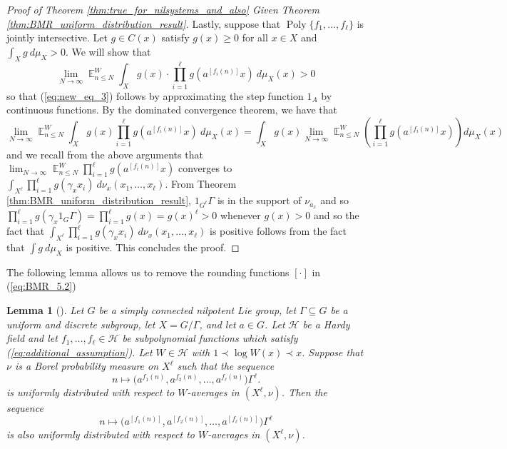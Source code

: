 \documentclass[12pt]{article}
\theoremstyle{plain} %
\newtheorem{lemma}[theorem]{Lemma}
\theoremstyle{definition} %
\theoremstyle{plain}
\theoremstyle{plain}
\numberwithin{equation}{section}
\renewcommand{\leq}{\leqslant}
\renewcommand{\geq}{\geqslant}
\renewcommand{\subset}{\subseteq}
\newcommand{\1}{\mathbbm{1}}
\newcommand{\E}{\operatorname{\mathbb{E}}}
\newcommand{\Poly}{\operatorname{Poly}}
\newcommand{\oo}{\infty}
\newcommand{\round}[1]{[ #1 ]}
\begin{document}
\begin{proof}[Proof of Theorem \ref{thm:true_for_nilsystems_and_also} Given Theorem \ref{thm:BMR_uniform_distribution_result}]
Lastly, suppose that $\Poly\{f_1,\dots, f_{\ell}\}$ is jointly intersective. Let $g\in C(x)$ satisfy $g(x)\geq 0$ for all $x\in X$ and $\int_X g~d\mu_X>0$. We will show that 
\begin{equation}\label{eq:u.d._reduction_goal}
    \lim_{N\to\oo}\E_{n\leq N}^W\int_X g(x)\cdot \prod_{i=1}^{\ell}g(a^{\round{f_i(n)}}x)~d\mu_X(x) >0
\end{equation}
so that (\ref{eq:new_eq_3}) follows by approximating the step function $1_A$ by continuous functions. By the dominated convergence theorem, we have that
\[
\lim_{N\to\oo}\E_{n\leq N}^W\int_X g(x) \prod_{i=1}^{\ell}g(a^{\round{f_i(n)}}x)~d\mu_X(x)=\int_X g(x) \lim_{N\to\oo}\E_{n\leq N}^W\left(\prod_{i=1}^{\ell}g(a^{\round{f_i(n)}}x)\right)d\mu_X(x) 
\]
and we recall from the above arguments that $\lim_{N\to\oo}\E_{n\leq N}^W\prod_{i=1}^{\ell}g(a^{\round{f_i(n)}}x)$ converges to $\int_{X^{\ell}}\prod_{i=1}^{\ell}g(\gamma_x x_i)~d\nu_{x}(x_1,\dots, x_{\ell})$. From Theorem \ref{thm:BMR_uniform_distribution_result}, $1_{G^{\ell}}\Gamma$ is in the support of $\nu_{a_x}$ and so $\prod_{i=1}^{\ell}g(\gamma_x 1_{G}\Gamma) = \prod_{i=1}^{\ell}g(x) =g(x)^{\ell}>0$ whenever $g(x)>0$ and so the fact that $\int_{X^{\ell}}\prod_{i=1}^{\ell}g(\gamma_x x_i)~d\nu_{x}(x_1,\dots, x_{\ell})$ is positive follows from the fact that $\int g ~d\mu_X$ is positive. This concludes the proof. 
\end{proof}


The following lemma allows us to remove the rounding functions $\round{\cdot}$ in (\ref{eq:BMR_5.2})  

\begin{lemma}[{\cite[Section 5.4]{BMR24}}]\label{lem:floor_removal}
Let $G$ be a simply connected nilpotent Lie group, let
$\Gamma \subset G$ be a uniform and discrete subgroup, let
$X = G/\Gamma$, and let $a \in G$. Let $\mathcal{H}$ be a Hardy field and let $f_1,\ldots,f_{\ell} \in \mathcal{H}$ be subpolynomial functions which satisfy (\ref{eq:additional_assumption}). Let $W \in \mathcal{H}$ with $1 \prec \log W(x) \prec x$. Suppose that $\nu$ is a Borel probability measure on $X^{\ell}$ such that the sequence
\begin{equation}\label{eq:BMR_no_floor}
n \mapsto \bigl(a^{ {f_1(n)}},
a^{ {f_2(n)}},\ldots,
a^{ {f_{\ell}(n)}}\bigr)\Gamma^{\ell}.
\end{equation}
is uniformly distributed with respect to $W$-averages in $(X^{\ell},\nu)$. Then the sequence
\begin{equation}
n \mapsto \bigl(a^{ \round{f_1(n)}},
a^{ \round{f_2(n)}},\ldots,
a^{ \round{f_{\ell}(n)}}\bigr)\Gamma^{\ell}
\end{equation}
is also uniformly distributed with respect to $W$-averages in $(X^{\ell},\nu)$.
\end{lemma}
\end{document}
